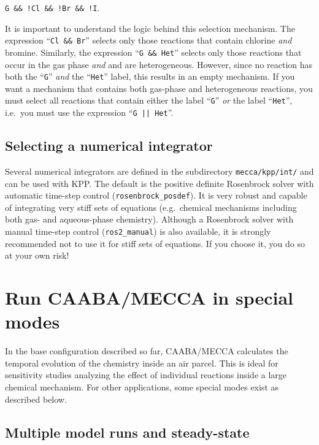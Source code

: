 \documentclass[twoside]{article}
\begin{document}
\verb|G && !Cl && !Br && !I|.

It is important to understand the logic behind this selection mechanism.
The expression ``\verb|Cl && Br|'' selects only those reactions that
contain chlorine {\em and} bromine. Similarly, the expression
``\verb|G && Het|'' selects only those reactions that occur in the gas
phase {\em and} and are heterogeneous. However, since no reaction has
both the ``\verb|G|'' {\em and} the ``\verb|Het|'' label, this results
in an empty mechanism. If you want a mechanism that contains both
gas-phase and heterogeneous reactions, you must select all reactions
that contain either the label ``\verb|G|'' {\em or} the label
``\verb|Het|'', i.e.\ you must use the expression ``\verb!G || Het!''.

\subsection{Selecting a numerical integrator}
\label{sec:selectintegrator}

Several numerical integrators are defined in the subdirectory
\verb|mecca/kpp/int/| and can be used with KPP. The default is the
positive definite Rosenbrock solver with automatic time-step control
(\verb|rosenbrock_posdef|). It is very robust and capable of integrating
very stiff sets of equations (e.g.\ chemical mechanisms including both
gas- and aqueous-phase chemistry). Although a Rosenbrock solver with
manual time-step control (\verb|ros2_manual|) is also available, it is
strongly recommended not to use it for stiff sets of equations. If you
choose it, you do so at your own risk!

\section{Run CAABA/MECCA in special modes}
\label{sec:special}

In the base configuration described so far, CAABA/MECCA calculates the
temporal evolution of the chemistry inside an air parcel. This is ideal
for sensitivity studies analyzing the effect of individual reactions
inside a large chemical mechanism. For other applications, some special
modes exist as described below.

\subsection{Multiple model runs and steady-state}
\label{sec:multirun}
\end{document}
